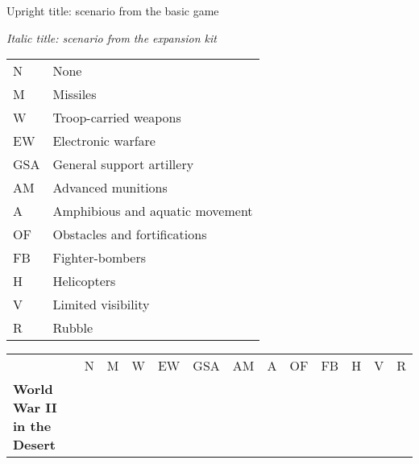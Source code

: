 \documentclass[a4paper]{article}
\newenvironment{texte}{\rmfamily\footnotesize}{}
\begin{document}
\begin{texte}


Upright title: scenario from the basic game

\textit{Italic title: scenario from the expansion kit}

\vspace*{5mm}

\begin{tabular}{ll}
N    &   None                             \\
M    &   Missiles                         \\
W    &   Troop-carried weapons            \\
EW   &   Electronic warfare               \\
GSA  &   General support artillery        \\
AM   &   Advanced munitions               \\
A    &   Amphibious and aquatic movement  \\
OF   &   Obstacles and fortifications     \\
FB   &   Fighter-bombers                  \\
H    &   Helicopters                      \\
V    &   Limited visibility               \\
R    &   Rubble                           \\ 
\end{tabular}

\begin{tabular}{lrrrrrrrrrrrr}
                                                   & N &  M &  W & EW & GSA & AM & A & OF & FB & H &  V & R \\

\bf World War II in the Desert \\


\end{tabular}
\end{texte}
\end{document}
